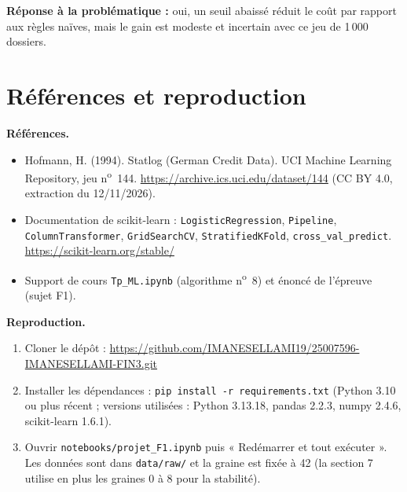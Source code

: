 \documentclass[11pt,a4paper]{article}
\newcommand{\code}[1]{\texttt{\small #1}}
\begin{document}
\textbf{Réponse à la problématique :} oui, un seuil abaissé réduit le coût par rapport aux règles naïves, mais le gain est modeste et incertain avec ce jeu de 1\,000 dossiers.

\section{Références et reproduction}

\textbf{Références.}
\begin{itemize}
\item Hofmann, H. (1994). Statlog (German Credit Data). UCI Machine Learning Repository, jeu n\textsuperscript{o}~144. \url{https://archive.ics.uci.edu/dataset/144} (CC BY 4.0, extraction du 12/11/2026).
\item Documentation de scikit-learn : \code{LogisticRegression}, \code{Pipeline}, \code{ColumnTransformer}, \code{GridSearchCV}, \code{StratifiedKFold}, \code{cross\_val\_predict}. \url{https://scikit-learn.org/stable/}
\item Support de cours \code{Tp\_ML.ipynb} (algorithme n\textsuperscript{o}~8) et énoncé de l'épreuve (sujet F1).
\end{itemize}

\textbf{Reproduction.}
\begin{enumerate}[leftmargin=1.5em]
\item Cloner le dépôt : \url{https://github.com/IMANESELLAMI19/25007596-IMANESELLAMI-FIN3.git}
\item Installer les dépendances : \code{pip install -r requirements.txt} (Python 3.10 ou plus récent ; versions utilisées : Python 3.13.18, pandas 2.2.3, numpy 2.4.6, scikit-learn 1.6.1).
\item Ouvrir \code{notebooks/projet\_F1.ipynb} puis « Redémarrer et tout exécuter ». Les données sont dans \code{data/raw/} et la graine est fixée à 42 (la section 7 utilise en plus les graines 0 à 8 pour la stabilité).
\end{enumerate}
\end{document}
